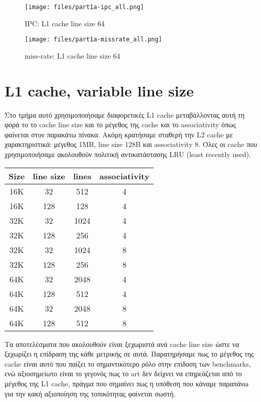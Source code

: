 \documentclass[a4paper,12pt]{article}
\begin{document}
\begin{figure}[H]
    \centering
    \texttt{[image: files/part1a-ipc\_all.png]}
    \caption{IPC: L1 cache line size 64}
\end{figure}


\begin{figure}[H]
    \centering
    \texttt{[image: files/part1a-missrate\_all.png]}
    \caption{miss-rate: L1 cache line size 64}
\end{figure}


\pagebreak


\section{L1 cache, variable line size}

Στο τμήμα αυτό χρησιμοποιήσαμε διαφορετικές L1 cache μεταβάλλοντας αυτή τη
φορά το το cache line size και το μέγεθος της cache και το associativity όπως
φαίνεται στον παρακάτω πίνακα. Ακόμη κρατήσαμε σταθερή την L2 cache με
χαρακτηριστικά: μέγεθος 1ΜΒ, line size 128B και associativity 8. Όλες οι cache
που χρησιμοποιήσαμε ακολουθούν πολιτική αντικατάστασης LRU (least recently
used).

\begin{table}[H]
    \centering
    \begin{tabular}{c c c c}
        Size & line size &lines & associativity\\ 
        \hline
        \hline
        16K & 32    & 512   & 4\\
        16K & 128   & 128   & 4\\
        \hline
        32K & 32    & 1024  & 4\\
        32K & 128   & 256   & 4\\
        32K & 32    & 1024  & 8\\
        32K & 128   & 256   & 8\\
        \hline
        64K & 32    & 2048  & 4\\
        64K & 128   & 512   & 4\\
        64K & 32    & 2048  & 8\\
        64K & 128   & 512   & 8\\
    \end{tabular}
\end{table}

Τα αποτελέσματα που ακολουθούν είναι ξεχωριστά ανά cache line size ώστε να
ξεχωρίζει η επίδραση της κάθε μετρικής σε αυτά. Παρατηρήσαμε πως το μέγεθος
της cache είναι αυτό που παίζει το σημαντικότερο ρόλο στην επίδοση των
benchmarks, ενώ αξιοσημείωτο είναι το γεγονός πως το art δεν δείχνει να
επηρεάζεται από το μέγεθος της L1 cache, πράγμα που σημαίνει πως η υπόθεση
που κάναμε παραπάνω για την κακή αξιοποίηση της τοπικότητας φαίνεται σωστή.
\end{document}
